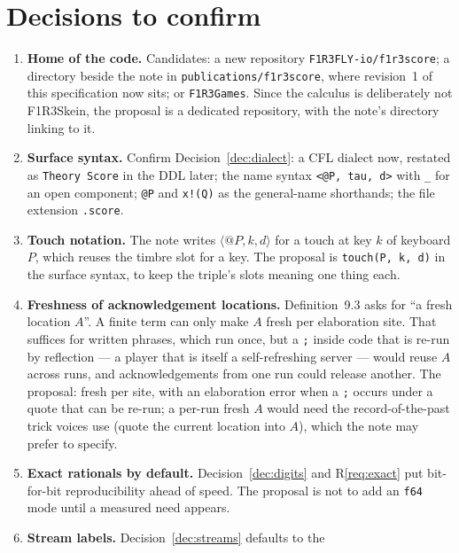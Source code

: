 \documentclass[11pt,a4paper]{article}
\theoremstyle{definition}
\theoremstyle{remark}
\begin{document}
\section{Decisions to confirm}\label{sec:open}

\begin{enumerate}[leftmargin=*,itemsep=3pt]
\item \textbf{Home of the code.} Candidates: a new repository
  \texttt{F1R3FLY-io/f1r3score}; a directory beside the note in
  \texttt{publications/f1r3score}, where revision~1 of this specification now
  sits; or \texttt{F1R3Games}. Since the calculus is deliberately not F1R3Skein,
  the proposal is a dedicated repository, with the note's directory linking to
  it.
\item \textbf{Surface syntax.} Confirm Decision~\ref{dec:dialect}: a CFL
  dialect now, restated as \texttt{Theory Score} in the DDL later; the name
  syntax \texttt{<@P, tau, d>} with \texttt{\_} for an open component;
  \texttt{@P} and \texttt{x!(Q)} as the general-name shorthands; the file
  extension \texttt{.score}.
\item \textbf{Touch notation.} The note writes $\langle @P,k,d\rangle$ for a
  touch at key $k$ of keyboard $P$, which reuses the timbre slot for a key. The
  proposal is \texttt{touch(P, k, d)} in the surface syntax, to keep the
  triple's slots meaning one thing each.
\item \textbf{Freshness of acknowledgement locations.}\label{dec:ackfresh}
  Definition~9.3 asks for ``a fresh location $A$''. A finite term can only make
  $A$ fresh per elaboration site. That suffices for written phrases, which run
  once, but a \texttt{;} inside code that is re-run by reflection --- a player
  that is itself a self-refreshing server --- would reuse $A$ across runs, and
  acknowledgements from one run could release another. The proposal: fresh per
  site, with an elaboration error when a \texttt{;} occurs under a quote that
  can be re-run; a per-run fresh $A$ would need the record-of-the-past trick
  voices use (quote the current location into $A$), which the note may prefer
  to specify.
\item \textbf{Exact rationals by default.} Decision~\ref{dec:digits} and
  R\ref{req:exact} put bit-for-bit reproducibility ahead of speed. The proposal
  is not to add an \texttt{f64} mode until a measured need appears.
\item \textbf{Stream labels.} Decision~\ref{dec:streams} defaults to the

\end{enumerate}
\end{document}
